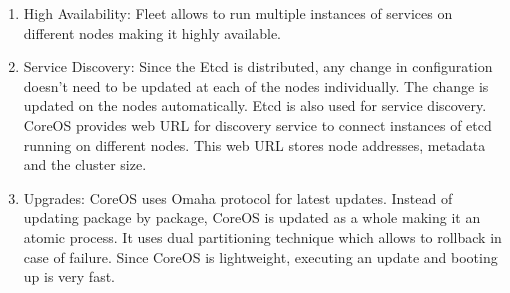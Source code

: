 \begin{enumerate}
\item High Availability:
Fleet allows to run multiple instances of services on different nodes making it highly available.

\item Service Discovery:
Since the Etcd is distributed, any change in configuration doesn't need to be updated at each of the nodes individually. The change is updated on the nodes automatically. Etcd is also used for service discovery. CoreOS provides web URL for discovery service to connect instances of etcd running on different nodes. This web URL stores node addresses, metadata and the cluster size. 

\item Upgrades:
CoreOS uses Omaha protocol for latest updates. Instead of updating package by package, CoreOS is updated as a whole making it an atomic process. It uses dual partitioning technique which allows to rollback in case of failure. Since CoreOS is lightweight, executing an update and booting up is very fast.

\end{enumerate}